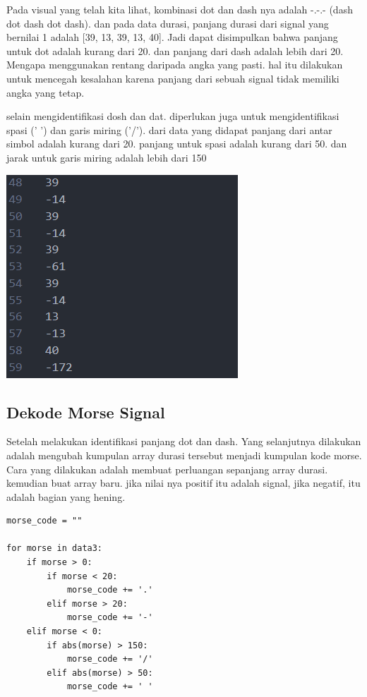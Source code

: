 \documentclass[]{article}
\begin{document}
Pada visual yang telah kita lihat, kombinasi dot dan dash nya  adalah -.-.- (dash dot dash dot dash). dan pada data durasi, panjang durasi dari signal yang bernilai 1 adalah [39, 13, 39, 13, 40]. Jadi dapat disimpulkan bahwa panjang untuk dot adalah kurang dari 20. dan panjang dari dash adalah lebih dari 20. Mengapa menggunakan rentang daripada angka yang pasti. hal itu dilakukan untuk mencegah kesalahan karena panjang dari sebuah signal tidak memiliki angka yang tetap.

selain mengidentifikasi dosh dan dat. diperlukan juga untuk mengidentifikasi spasi (' ') dan garis miring ('/'). dari data yang didapat panjang dari antar simbol adalah kurang dari 20. panjang untuk spasi adalah kurang dari 50. dan jarak untuk garis miring adalah lebih dari 150

\begin{center}
	\includegraphics[width=0.7\linewidth]{img/screenshot008}
\end{center}

\subsection{Dekode Morse Signal}
Setelah melakukan identifikasi panjang dot dan dash. Yang selanjutnya dilakukan adalah mengubah kumpulan array durasi tersebut menjadi kumpulan kode morse. Cara yang dilakukan adalah membuat perluangan sepanjang array durasi. kemudian buat array baru. jika nilai nya positif itu adalah signal, jika negatif, itu adalah bagian yang hening.

\begin{lstlisting}
morse_code = ""

for morse in data3:
	if morse > 0:
		if morse < 20:
			morse_code += '.'
		elif morse > 20:
			morse_code += '-'
	elif morse < 0:
		if abs(morse) > 150:
			morse_code += '/'
		elif abs(morse) > 50:
			morse_code += ' '
\end{lstlisting}
\end{document}
